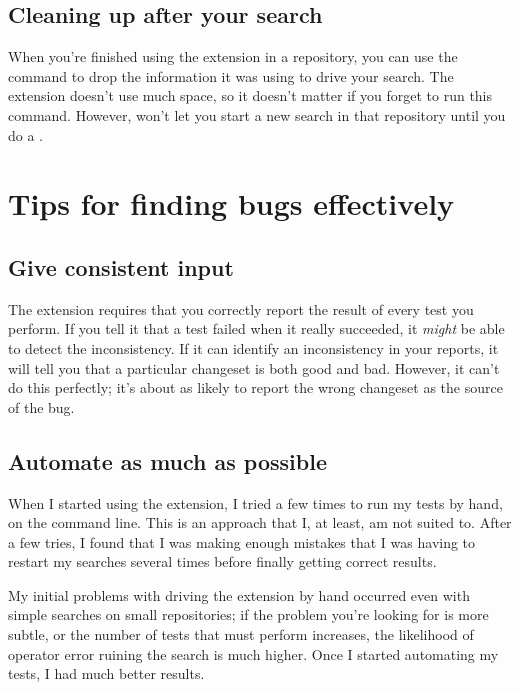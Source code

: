 \subsection{Cleaning up after your search}

When you're finished using the  extension in a
repository, you can use the  command to drop
the information it was using to drive your search.  The extension
doesn't use much space, so it doesn't matter if you forget to run this
command.  However,  won't let you start a new search in
that repository until you do a .

\section{Tips for finding bugs effectively}

\subsection{Give consistent input}

The  extension requires that you correctly report the
result of every test you perform.  If you tell it that a test failed
when it really succeeded, it \emph{might} be able to detect the
inconsistency.  If it can identify an inconsistency in your reports,
it will tell you that a particular changeset is both good and bad.
However, it can't do this perfectly; it's about as likely to report
the wrong changeset as the source of the bug.

\subsection{Automate as much as possible}

When I started using the  extension, I tried a few times
to run my tests by hand, on the command line.  This is an approach
that I, at least, am not suited to.  After a few tries, I found that I
was making enough mistakes that I was having to restart my searches
several times before finally getting correct results.  

My initial problems with driving the  extension by hand
occurred even with simple searches on small repositories; if the
problem you're looking for is more subtle, or the number of tests that
 must perform increases, the likelihood of operator
error ruining the search is much higher.  Once I started automating my
tests, I had much better results.


